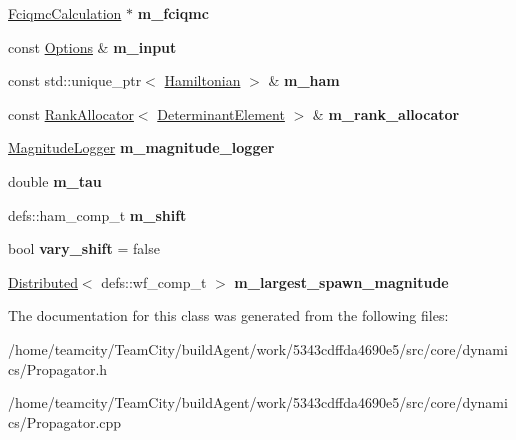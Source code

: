 \begin{DoxyCompactItemize}
\item 
\hyperlink{classFciqmcCalculation}{Fciqmc\+Calculation} $\ast$ {\bfseries m\+\_\+fciqmc}\hypertarget{classPropagator_a4e8f77154491c0ba05aea63c7eaa7782}{}\label{classPropagator_a4e8f77154491c0ba05aea63c7eaa7782}

\item 
const \hyperlink{structOptions}{Options} \& {\bfseries m\+\_\+input}\hypertarget{classPropagator_af3d5e986c9a3e8ba8e7cbd99a72ba06e}{}\label{classPropagator_af3d5e986c9a3e8ba8e7cbd99a72ba06e}

\item 
const std\+::unique\+\_\+ptr$<$ \hyperlink{classHamiltonian}{Hamiltonian} $>$ \& {\bfseries m\+\_\+ham}\hypertarget{classPropagator_a833303c5ec4014fc38307efe9f4459d8}{}\label{classPropagator_a833303c5ec4014fc38307efe9f4459d8}

\item 
const \hyperlink{classRankAllocator}{Rank\+Allocator}$<$ \hyperlink{classDeterminantElement}{Determinant\+Element} $>$ \& {\bfseries m\+\_\+rank\+\_\+allocator}\hypertarget{classPropagator_ae414f3d7cac59531bf137cc21516150a}{}\label{classPropagator_ae414f3d7cac59531bf137cc21516150a}

\item 
\hyperlink{classMagnitudeLogger}{Magnitude\+Logger} {\bfseries m\+\_\+magnitude\+\_\+logger}\hypertarget{classPropagator_a5131b9c4e15c10470af5c3893409e17c}{}\label{classPropagator_a5131b9c4e15c10470af5c3893409e17c}

\item 
double {\bfseries m\+\_\+tau}\hypertarget{classPropagator_af39851af12a48a31dc3359e7ba79c59f}{}\label{classPropagator_af39851af12a48a31dc3359e7ba79c59f}

\item 
defs\+::ham\+\_\+comp\+\_\+t {\bfseries m\+\_\+shift}\hypertarget{classPropagator_aebcf610f2d5b46f7632c6fd598700449}{}\label{classPropagator_aebcf610f2d5b46f7632c6fd598700449}

\item 
bool {\bfseries vary\+\_\+shift} = false\hypertarget{classPropagator_a0ed4dce86ccd8630b96d9b1d6daae9ec}{}\label{classPropagator_a0ed4dce86ccd8630b96d9b1d6daae9ec}

\item 
\hyperlink{classDistributed}{Distributed}$<$ defs\+::wf\+\_\+comp\+\_\+t $>$ {\bfseries m\+\_\+largest\+\_\+spawn\+\_\+magnitude}\hypertarget{classPropagator_a5c0106298a20ccbcb79da68ffd2b6166}{}\label{classPropagator_a5c0106298a20ccbcb79da68ffd2b6166}

\end{DoxyCompactItemize}


The documentation for this class was generated from the following files\+:\begin{DoxyCompactItemize}
\item 
/home/teamcity/\+Team\+City/build\+Agent/work/5343cdffda4690e5/src/core/dynamics/Propagator.\+h\item 
/home/teamcity/\+Team\+City/build\+Agent/work/5343cdffda4690e5/src/core/dynamics/Propagator.\+cpp\end{DoxyCompactItemize}
